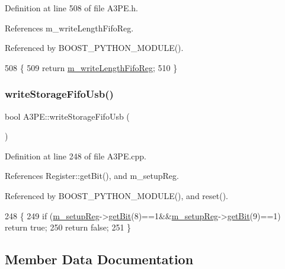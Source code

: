 Definition at line 508 of file A3\+P\+E.\+h.



References m\+\_\+write\+Length\+Fifo\+Reg.



Referenced by B\+O\+O\+S\+T\+\_\+\+P\+Y\+T\+H\+O\+N\+\_\+\+M\+O\+D\+U\+L\+E().


\begin{DoxyCode}
508                                 \{
509     \textcolor{keywordflow}{return} \hyperlink{classA3PE_a9a0cb2253ea34c0be567a03684217fee}{m\_writeLengthFifoReg};
510   \}
\end{DoxyCode}
\mbox{\label{classA3PE_af15048318a126074e28df1c6120d5e0d}} 
\subsubsection{\texorpdfstring{write\+Storage\+Fifo\+Usb()}{writeStorageFifoUsb()}}
{\footnotesize\ttfamily bool A3\+P\+E\+::write\+Storage\+Fifo\+Usb (\begin{DoxyParamCaption}{ }\end{DoxyParamCaption})}



Definition at line 248 of file A3\+P\+E.\+cpp.



References Register\+::get\+Bit(), and m\+\_\+setup\+Reg.



Referenced by B\+O\+O\+S\+T\+\_\+\+P\+Y\+T\+H\+O\+N\+\_\+\+M\+O\+D\+U\+L\+E(), and reset().


\begin{DoxyCode}
248                               \{
249   \textcolor{keywordflow}{if} (\hyperlink{classA3PE_a142fa10b7e705c4701ae21678ec2ec8a}{m\_setupReg}->\hyperlink{classRegister_a5d27c9ff548817eee097ba4fdc8e8f69}{getBit}(8)==1&&\hyperlink{classA3PE_a142fa10b7e705c4701ae21678ec2ec8a}{m\_setupReg}->\hyperlink{classRegister_a5d27c9ff548817eee097ba4fdc8e8f69}{getBit}(9)==1) \textcolor{keywordflow}{return} \textcolor{keyword}{true};
250   \textcolor{keywordflow}{return} \textcolor{keyword}{false};
251 \}
\end{DoxyCode}


\subsection{Member Data Documentation}
\mbox{\label{classA3PE_abaf426f4c9192537117b77f9f4821e04}} 
